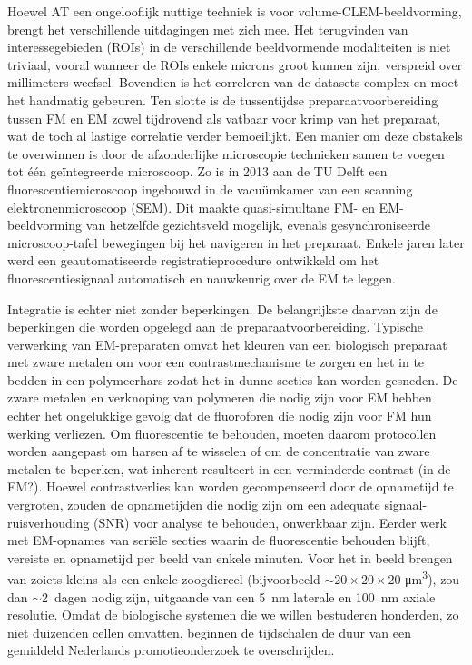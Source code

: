 Hoewel AT een ongelooflijk nuttige techniek is voor volume-CLEM-beeldvorming, brengt het verschillende uitdagingen met zich mee. Het terugvinden van interessegebieden (ROIs) in de verschillende beeldvormende modaliteiten is niet triviaal, vooral wanneer de ROIs enkele microns groot kunnen zijn, verspreid over millimeters weefsel. Bovendien is het correleren van de datasets complex en moet het handmatig gebeuren. Ten slotte is de tussentijdse preparaatvoorbereiding tussen FM en EM zowel tijdrovend als vatbaar voor krimp van het preparaat, wat de toch al lastige correlatie verder bemoeilijkt. Een manier om deze obstakels te overwinnen is door de afzonderlijke microscopie technieken samen te voegen tot één geïntegreerde microscoop. Zo is in 2013 aan de TU Delft een fluorescentiemicroscoop ingebouwd in de vacuümkamer van een scanning elektronenmicroscoop (SEM). Dit maakte quasi-simultane FM- en EM-beeldvorming van hetzelfde gezichtsveld mogelijk, evenals gesynchroniseerde microscoop-tafel bewegingen bij het navigeren in het preparaat. Enkele jaren later werd een geautomatiseerde registratieprocedure ontwikkeld om het fluorescentiesignaal automatisch en nauwkeurig over de EM te leggen.

Integratie is echter niet zonder beperkingen. De belangrijkste daarvan zijn de beperkingen die worden opgelegd aan de preparaatvoorbereiding. Typische verwerking van EM-preparaten omvat het kleuren van een biologisch preparaat met zware metalen om voor een contrastmechanisme te zorgen en het in te bedden in een polymeerhars zodat het in dunne secties kan worden gesneden. De zware metalen en verknoping van polymeren die nodig zijn voor EM hebben echter het ongelukkige gevolg dat de fluoroforen die nodig zijn voor FM hun werking verliezen. Om fluorescentie te behouden, moeten daarom protocollen worden aangepast om harsen af te wisselen of om de concentratie van zware metalen te beperken, wat inherent resulteert in een verminderde contrast (in de EM?). Hoewel contrastverlies kan worden gecompenseerd door de opnametijd te vergroten, zouden de opnametijden die nodig zijn om een adequate signaal-ruisverhouding (SNR) voor analyse te behouden, onwerkbaar zijn. Eerder werk met EM-opnames van seriële secties waarin de fluorescentie behouden blijft, vereiste en opnametijd per beeld van enkele minuten. Voor het in beeld brengen van zoiets kleins als een enkele zoogdiercel (bijvoorbeeld ${\sim}\text{20} \times \text{20} \times \text{20}$ \si{\micro\meter^3}), zou dan ${\sim}$\SI{2}{dagen} nodig zijn, uitgaande van een \SI{5}{\nano\meter} laterale en \SI{100}{\nano\meter} axiale resolutie. Omdat de biologische systemen die we willen bestuderen honderden, zo niet duizenden cellen omvatten, beginnen de tijdschalen de duur van een gemiddeld Nederlands promotieonderzoek te overschrijden.

